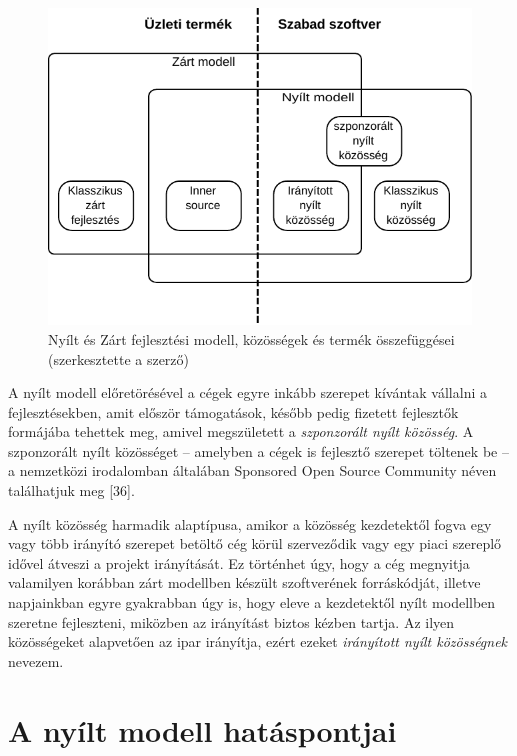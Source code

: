 \documentclass[12pt,magyar,a4paper,oneside]{scrreprt}
\begin{document}
\begin{figure}
\centering
\includegraphics{ábrák/nyílt-és-zárt-modell.pdf}
\caption{Nyílt és Zárt fejlesztési modell, közösségek és termék
összefüggései (szerkesztette a szerző)}
\end{figure}

A nyílt modell előretörésével a cégek egyre inkább szerepet kívántak
vállalni a fejlesztésekben, amit először támogatások, később pedig
fizetett fejlesztők formájába tehettek meg, amivel megszületett a
\emph{szponzorált nyílt közösség}. A szponzorált nyílt közösséget --
amelyben a cégek is fejlesztő szerepet töltenek be -- a nemzetközi
irodalomban általában Sponsored Open Source Community néven találhatjuk
meg {[}36{]}.

A nyílt közösség harmadik alaptípusa, amikor a közösség kezdetektől
fogva egy vagy több irányító szerepet betöltő cég körül szerveződik vagy
egy piaci szereplő idővel átveszi a projekt irányítását. Ez történhet
úgy, hogy a cég megnyitja valamilyen korábban zárt modellben készült
szoftverének forráskódját, illetve napjainkban egyre gyakrabban úgy is,
hogy eleve a kezdetektől nyílt modellben szeretne fejleszteni, miközben
az irányítást biztos kézben tartja. Az ilyen közösségeket alapvetően az
ipar irányítja, ezért ezeket \emph{irányított nyílt közösségnek}
nevezem.

\hypertarget{sec:FLOSSHP}{%
\section{A nyílt modell hatáspontjai}\label{sec:FLOSSHP}}
\end{document}
